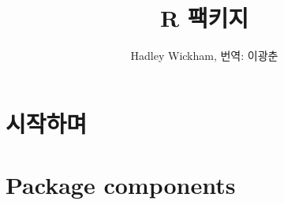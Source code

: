 \documentclass{book}
\title{R 팩키지}
\author{Hadley Wickham, 번역: 이광춘}
\begin{document}
\frontmatter
\maketitle

\tableofcontents

\mainmatter

\part{시작하며}


\part{Package components}

%
%
%
%
%
%
%
%
%
%
%
%
\end{document}

